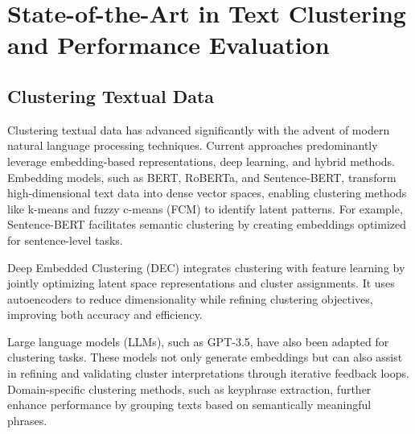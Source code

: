 \documentclass[11pt]{article}
\begin{document}


\section{State-of-the-Art in Text Clustering and Performance Evaluation}

\subsection{Clustering Textual Data}
Clustering textual data has advanced significantly with the advent of modern natural language processing techniques. Current approaches predominantly leverage embedding-based representations, deep learning, and hybrid methods. Embedding models, such as BERT, RoBERTa, and Sentence-BERT, transform high-dimensional text data into dense vector spaces, enabling clustering methods like k-means and fuzzy c-means (FCM) to identify latent patterns. For example, Sentence-BERT facilitates semantic clustering by creating embeddings optimized for sentence-level tasks.  

Deep Embedded Clustering (DEC) integrates clustering with feature learning by jointly optimizing latent space representations and cluster assignments. It uses autoencoders to reduce dimensionality while refining clustering objectives, improving both accuracy and efficiency.

Large language models (LLMs), such as GPT-3.5, have also been adapted for clustering tasks. These models not only generate embeddings but can also assist in refining and validating cluster interpretations through iterative feedback loops. Domain-specific clustering methods, such as keyphrase extraction, further enhance performance by grouping texts based on semantically meaningful phrases.
\end{document}
